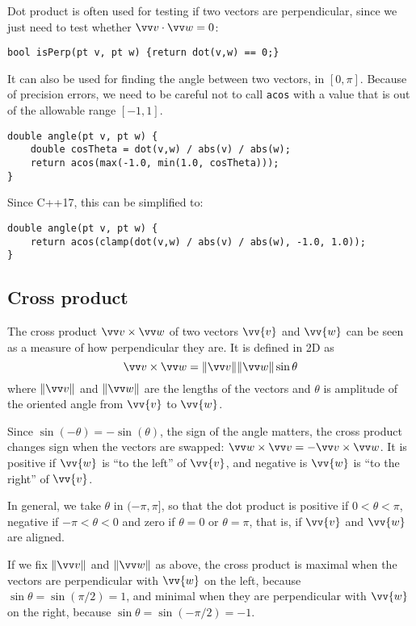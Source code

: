 Dot product is often used for testing if two vectors are perpendicular, since we just need to test whether $\dotv{v}{w} = 0$:
\begin{lstlisting}
bool isPerp(pt v, pt w) {return dot(v,w) == 0;}
\end{lstlisting}

It can also be used for finding the angle between two vectors, in $[0,\pi]$. Because of precision errors, we need to be careful not to call \lstinline|acos| with a value that is out of the allowable range $[-1,1]$.
\begin{lstlisting}
double angle(pt v, pt w) {
    double cosTheta = dot(v,w) / abs(v) / abs(w);
    return acos(max(-1.0, min(1.0, cosTheta)));
}
\end{lstlisting}
Since C++17, this can be simplified to:
\begin{lstlisting}
double angle(pt v, pt w) {
    return acos(clamp(dot(v,w) / abs(v) / abs(w), -1.0, 1.0));
}
\end{lstlisting}

\subsection{Cross product}\label{ss:cross}
The cross product $\crossv{v}{w}$ of two vectors $\vv{v}$ and $\vv{w}$ can be seen as a measure of how perpendicular they are. It is defined in 2D as \[\crossv{v}{w} = \normv{v}\normv{w} \sin\theta\] where $\normv{v}$ and $\normv{w}$ are the lengths of the vectors and $\theta$ is amplitude of the oriented angle from $\vv{v}$ to $\vv{w}$.

Since $\sin(-\theta) = -\sin(\theta)$, the sign of the angle matters, the cross product changes sign when the vectors are swapped: $\crossv{w}{v} = -\crossv{v}{w}$. It is positive if $\vv{w}$ is ``to the left'' of $\vv{v}$, and negative is $\vv{w}$ is ``to the right'' of $\vv{v}$.


In general, we take $\theta$ in $(-\pi,\pi]$, so that the dot product is positive if $0 < \theta < \pi$, negative if $-\pi < \theta < 0$ and zero if $\theta = 0$ or $\theta = \pi$, that is, if $\vv{v}$ and $\vv{w}$ are aligned.



If we fix $\normv{v}$ and $\normv{w}$ as above, the cross product is maximal when the vectors are perpendicular with $\vv{w}$ on the left, because $\sin\theta = \sin(\pi/2) = 1$, and minimal when they are perpendicular with $\vv{w}$ on the right, because $\sin\theta = \sin(-\pi/2) = -1$.



